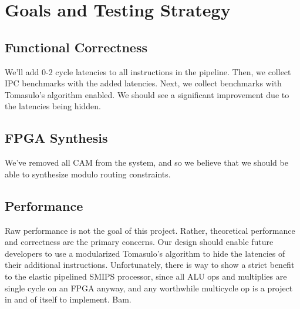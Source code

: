 \documentclass[12pt]{article}
\begin{document}
\section{Goals and Testing Strategy}

\subsection{Functional Correctness}
We'll add 0-2 cycle latencies to all instructions in the pipeline. Then, we collect IPC benchmarks with the added latencies.
Next, we collect benchmarks with Tomasulo's algorithm enabled. We should see a significant improvement due to the latencies
being hidden.
\subsection{FPGA Synthesis}
We've removed all CAM from the system, and so we believe that we should be able to synthesize modulo routing constraints.
\subsection{Performance}
Raw performance is not the goal of this project. Rather, theoretical performance and correctness are the primary concerns.
Our design should enable future developers to use a modularized Tomasulo's algorithm to hide the latencies of their additional instructions.
Unfortunately, there is way to show a strict benefit to the elastic pipelined SMIPS processor, since all ALU ops and multiplies 
are single cycle on an FPGA anyway, and any worthwhile multicycle op is a project in and of itself to implement. Bam.

 
\end{document}
